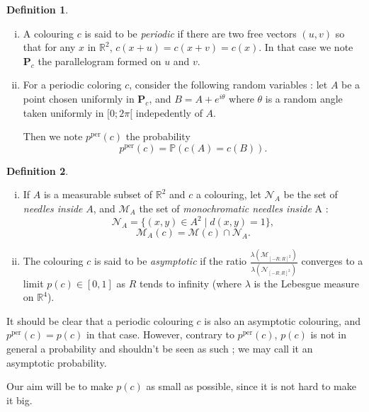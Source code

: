\documentclass[a4paper,11pt]{article}
\theoremstyle{definition}
\newtheorem{definition}{Definition}
\theoremstyle{remark}
\newcommand{\R}{\mathbb{R}}
\newcommand{\M}{\mathcal{M}}
\newcommand{\N}{\mathcal{N}}
\renewcommand{\Pr}{\mathbb{P}}
\renewcommand{\P}{\mathbf{P}}
\newcommand{\pper}{p^{\mathrm{per}}}
\begin{document}
\begin{definition}
\
\begin{enumerate}[i)] 
\item A colouring $c$ is said to be \textit{periodic} if there are two free
vectors $(u,v)$ so that for any $x$ in $\R ^2$, $c(x+u)=c(x+v)=c(x)$. In that
case we note $\P_c$ the parallelogram formed on $u$ and $v$.
\item For a periodic coloring $c$, consider the following random variables :
let $A$ be a point chosen uniformly in $\P_c$, and $B=A + e^{i \theta}$ where
$\theta$ is a random angle taken uniformly in $[0;2 \pi[$ indepedently of $A$.

Then we note $\pper(c)$ the probability
$$\pper(c) = \Pr(c(A)=c(B)).$$
\end{enumerate}
\end{definition}

\begin{definition}
\
\begin{enumerate}[i)]\label{defas}
\item If $A$ is a measurable subset of $\R^2$ and $c$ a colouring, let $\N_A$ be
the set of \textit{needles inside} $A$, and $\M_A$ the set of \textit{monochromatic
needles inside} A :
\[\N_A = \{(x,y) \in A ^2 \mid d(x,y)=1\}, \]
\[\M_A (c) = \M (c) \cap \N_A. \]

\item  \label{asympt}The colouring $c$ is said to be \textit{asymptotic} if the ratio
$\frac{\lambda (\M_{[-R;R]^2})}{\lambda (\N_{[-R;R]^2})}$ 
converges to a limit $p(c) \in [0,1]$ as $R$ tends to infinity (where $\lambda$ 
is the Lebesgue measure on $\mathbb{R}^4$).
\end{enumerate}
\end{definition}

It should be clear that a periodic colouring $c$ is also an asymptotic colouring,
and $\pper(c)=p(c)$ in that case. However, contrary to $\pper(c)$, $p(c)$ is not
in general a probability and shouldn't be seen as such ; we may call it an 
asymptotic probability.

Our aim will be to make $p(c)$ as small as possible, since it is not hard
to make it big.
\\
\end{document}
